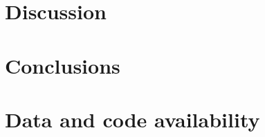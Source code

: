 \documentclass[11pt,a4paper]{article}
\begin{document}
%

\section{Discussion}


\section{Conclusions}


\section*{Data and code availability}

\end{document}
